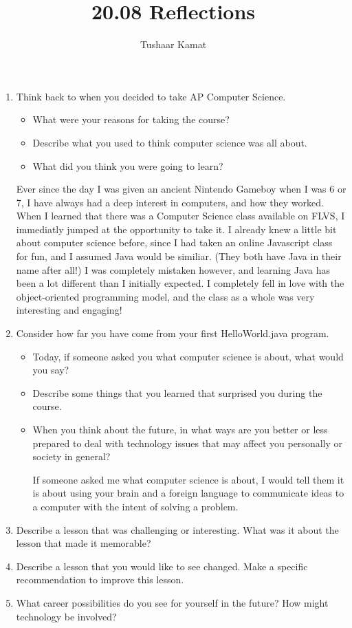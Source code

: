 \documentclass[12pt]{article}
\author{Tushaar Kamat}
\title{20.08 Reflections}
\begin{document}
\maketitle

\begin{enumerate}
\item Think back to when you decided to take AP Computer Science.
  \begin{itemize}
  \item What were your reasons for taking the course?
  \item Describe what you used to think computer science was all about.
  \item What did you think you were going to learn?
  \end{itemize}

  Ever since the day I was given an ancient Nintendo Gameboy when I was 6 or 7,
  I have always had a deep interest in computers, and how they worked. When I
  learned that there was a Computer Science class available on FLVS, I
  immediatly jumped at the opportunity to take it. I already knew a little bit
  about computer science before, since I had taken an online Javascript class
  for fun, and I assumed Java would be similiar. (They both have Java in their
  name after all!) I was completely mistaken however, and learning Java has been
  a lot different than I initially expected. I completely fell in love with the
  object-oriented programming model, and the class as a whole was very
  interesting and engaging!

\item Consider how far you have come from your first HelloWorld.java program.
  \begin{itemize}
  \item Today, if someone asked you what computer science is about, what would you
  say?
  \item Describe some things that you learned that surprised you during the
  course.
  \item When you think about the future, in what ways are you better or less
  prepared to deal with technology issues that may affect you personally or
  society in general?

  If someone asked me what computer science is about, I would tell them it is
  about using your brain and a foreign language to communicate ideas to a
  computer with the intent of solving a problem.  
\end{itemize}

\item Describe a lesson that was challenging or interesting. What was it about
  the lesson that made it memorable?

\item Describe a lesson that you would like to see changed. Make a specific
  recommendation to improve this lesson.

\item What career possibilities do you see for yourself in the future? How might
  technology be involved?
\end{enumerate}
\end{document}

